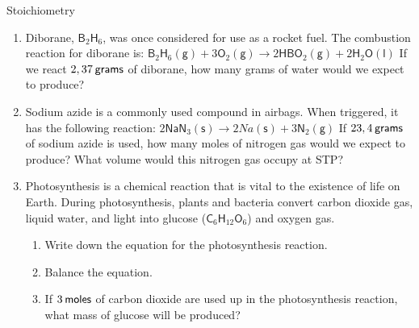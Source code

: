     \noindent
            \begin{exercises}{  Stoichiometry
      }
            \nopagebreak
      \label{m38712*id285393}\begin{enumerate}[noitemsep, label=\textbf{\arabic*}. ] 
            \label{m38712*uid101}\item Diborane, $\mathsf{B}{}_{2}\mathsf{H}{}_{6}$, was once considered for use as a rocket fuel. The combustion reaction for diborane is:
${\mathsf{B}}_{2}{\mathsf{H}}_{6}\left(\mathsf{g}\right)+3{\mathsf{O}}_{2}\left(\mathsf{g}\right)\to 2\mathsf{H}\mathsf{B}{\mathsf{O}}_{2}\left(\mathsf{g}\right)+2{\mathsf{H}}_{2}\mathsf{O}\left(\mathsf{l}\right)$
If we react $2,37\phantom{\rule{2pt}{0ex}}\mathsf{grams}$ of diborane, how many grams of water would we expect to produce?\newline
\label{m38712*uid102}\item Sodium azide is a commonly used compound in airbags. When triggered, it has the following reaction:
$2{\mathsf{NaN}}_{3}\left(\mathsf{s}\right)\to 2Na\left(\mathsf{s}\right)+3{\mathsf{N}}_{2}\left(\mathsf{g}\right)$
If $23,4\phantom{\rule{2pt}{0ex}}\mathsf{grams}$ of sodium azide is used, how many moles of nitrogen gas would we expect to produce? What volume would this nitrogen gas occupy at STP?\newline
\label{m38712*uid103}\item Photosynthesis is a chemical reaction that is vital to the existence of life on Earth. During photosynthesis, plants and bacteria convert carbon dioxide gas, liquid water, and light into glucose ($\mathsf{C}{}_{6}\mathsf{H}{}_{12}\mathsf{O}{}_{6}$) and oxygen gas.
\label{m38712*id285674}\begin{enumerate}[noitemsep, label=\textbf{\alph*}. ] 
            \label{m38712*uid104}\item Write down the equation for the photosynthesis reaction.
\label{m38712*uid105}\item Balance the equation.
\label{m38712*uid106}\item If $3\phantom{\rule{2pt}{0ex}}\mathsf{moles}$ of carbon dioxide are used up in the photosynthesis reaction, what mass of glucose will be produced?
\end{enumerate}
                \end{enumerate}
    \label{m38712*eip-269}
    \setcounter{subfigure}{0}
	\begin{figure}[H] %
    \label{m38712*slidesharemedia}\label{m38712*slideshareflash}

\end{figure}
\end{exercises}
